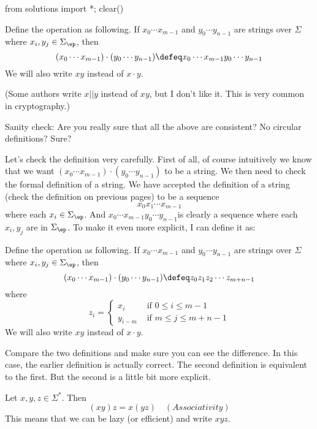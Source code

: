 \begin{python0}
from solutions import *; clear()
\end{python0}

\begin{defn}
  Define the  operation as following. If
  $x_0 \cdots x_{m-1}$ and $y_0 \cdots y_{n-1}$ are strings over $\Sigma$ where
  $x_i,y_j \in \Sigma_\ep$, then
  \[
  (x_0 \cdots x_{m-1}) \cdot (y_0 \cdots y_{n-1})
  \defeq x_0 \cdots x_{m-1} y_0 \cdots y_{n-1}
  \]
  We will also write $xy$ instead of $x\cdot y$.
\end{defn}

(Some authors write $x||y$ instead of $xy$, but I don't like it.
This is very common in cryptography.)

Sanity check: Are you really sure that all the above are
consistent? No circular definitions? Sure?

Let's check the definition very carefully.
First of all, of course intuitively we know that we want 
$(x_0 \cdots x_{m-1}) \cdot (y_0 \cdots y_{n-1})$
to be a string.
We then need to check the formal definition of a string.
We have accepted the definition of a string (check the definition on previous pages) to be a sequence
\[
x_0 x_1 \cdots x_{m-1}
\]
where each $x_i \in \Sigma_\ep$.
And $x_0 \cdots x_{m-1} y_0 \cdots y_{n-1}$is clearly a sequence where each $x_i, y_j$ are in $\Sigma_\ep$.
To make it even more explicit, I can define it as:

\begin{defn}
  Define the  operation as following. If
  $x_0 \cdots x_{m-1}$ and $y_0 \cdots y_{n-1}$ are strings over $\Sigma$ where
  $x_i,y_j \in \Sigma_\ep$, then
  \[
  (x_0 \cdots x_{m-1}) \cdot (y_0 \cdots y_{n-1})
  \defeq z_0 z_1 z_2 \cdots z_{m + n - 1}
  \]
  where
  \[
  z_i =
  \begin{cases}
    x_i & \text{ if $0 \leq i \leq m - 1$} \\
    y_{i - m} & \text{ if $m \leq j \leq m + n - 1$}
  \end{cases}
  \]
  We will also write $xy$ instead of $x\cdot y$.
\end{defn}

Compare the two definitions and make sure you can see the difference.
In this case, the earlier definition is actually correct.
The second definition is equivalent to the first.
But the second is a little bit more explicit.

\begin{prop}
Let $x,y,z\in \Sigma^*$. Then
\[ (xy) z = x(yz) \quad (Associativity) \]
This means that we can be lazy (or efficient) and write $xyz$.
\end{prop}


